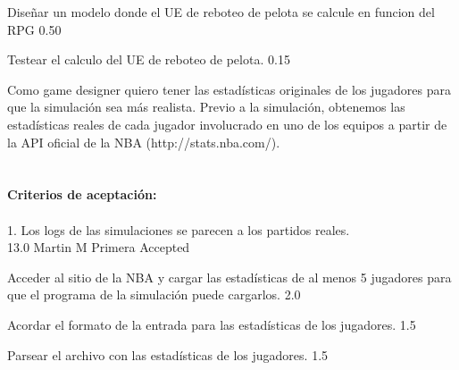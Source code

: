 		{Diseñar un modelo donde el UE de reboteo de pelota se calcule en funcion del RPG} %
		{} %
		{0.50} %
		{} %
		{} %
		{} %

		{Testear el calculo del UE de reboteo de pelota.} %
		{} %
		{0.15} %
		{} %
		{} %
		{} %

\vspace{20pt}

	{Como game designer quiero tener las estad\'isticas originales de los jugadores para que la simulaci\'on sea m\'as realista.} %
	{Previo a la simulación, obtenemos las estadísticas reales de cada jugador involucrado en uno de los equipos a partir de la API oficial de la NBA (http://stats.nba.com/).\\
  \\
  \\
\textbf{Criterios de aceptación:}\\
  \\
1. Los logs de las simulaciones se parecen a los partidos reales. \\
} %
	{} %
	{13.0} %
	{Martin M} %
	{Primera} %
	{Accepted} %

		{Acceder al sitio de la NBA y cargar las estadísticas de al menos 5 jugadores para que el programa de la simulación puede cargarlos.} %
		{} %
		{2.0} %
		{} %
		{} %
		{} %

		{Acordar el formato de la entrada para las estadísticas de los jugadores.} %
		{} %
		{1.5} %
		{} %
		{} %
		{} %

		{Parsear el archivo con las estadísticas de los jugadores.} %
		{} %
		{1.5} %
		{} %
		{} %
		{} %

